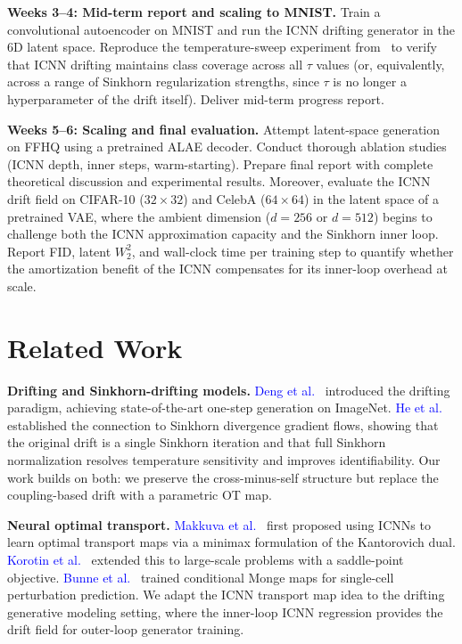 \documentclass[10pt,conference,compsocconf]{IEEEtran}
\newcommand{\citet}[2]{\textcolor{blue}{#1}~\cite{#2}}
\begin{document}
\textbf{Weeks 3--4: Mid-term report and scaling to MNIST.}
Train a convolutional autoencoder on MNIST and run the ICNN drifting generator in the 6D latent space.
Reproduce the temperature-sweep experiment from~\cite{he2026sinkhorn} to verify that ICNN drifting maintains class coverage across all $\tau$ values (or, equivalently, across a range of Sinkhorn regularization strengths, since $\tau$ is no longer a hyperparameter of the drift itself).
Deliver mid-term progress report.

\textbf{Weeks 5--6: Scaling and final evaluation.}
Attempt latent-space generation on FFHQ using a pretrained ALAE decoder.
Conduct thorough ablation studies (ICNN depth, inner steps, warm-starting).
Prepare final report with complete theoretical discussion and experimental results. Moreover, evaluate the ICNN drift field on CIFAR-10 ($32{\times}32$) and CelebA ($64{\times}64$) in the latent space of a pretrained VAE, where the ambient dimension ($d{=}256$ or $d{=}512$) begins to challenge both the ICNN approximation capacity and the Sinkhorn inner loop.
Report FID, latent $W_2^2$, and wall-clock time per training step to quantify whether the amortization benefit of the ICNN compensates for its inner-loop overhead at scale.

\section{Related Work}

\textbf{Drifting and Sinkhorn-drifting models.}
\citet{Deng et al.}{deng2026drifting} introduced the drifting paradigm, achieving state-of-the-art one-step generation on ImageNet.
\citet{He et al.}{he2026sinkhorn} established the connection to Sinkhorn divergence gradient flows, showing that the original drift is a single Sinkhorn iteration and that full Sinkhorn normalization resolves temperature sensitivity and improves identifiability.
Our work builds on both: we preserve the cross-minus-self structure but replace the coupling-based drift with a parametric OT map.

\textbf{Neural optimal transport.}
\citet{Makkuva et al.}{makkuva2020optimal} first proposed using ICNNs to learn optimal transport maps via a minimax formulation of the Kantorovich dual.
\citet{Korotin et al.}{korotin2022neural} extended this to large-scale problems with a saddle-point objective.
\citet{Bunne et al.}{bunne2022supervised} trained conditional Monge maps for single-cell perturbation prediction.
We adapt the ICNN transport map idea to the drifting generative modeling setting, where the inner-loop ICNN regression provides the drift field for outer-loop generator training.
\end{document}
